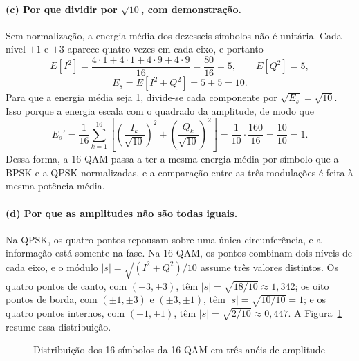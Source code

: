 \paragraph{(c) Por que dividir por $\sqrt{10}$, com demonstração.} Sem normalização, a energia média dos dezesseis símbolos não é unitária. Cada nível $\pm1$ e $\pm3$ aparece quatro vezes em cada eixo, e portanto
\begin{equation}
E[I^2]=\frac{4\cdot1+4\cdot1+4\cdot9+4\cdot9}{16}=\frac{80}{16}=5,
\qquad
E[Q^2]=5,
\end{equation}
\begin{equation}
E_s=E[I^2+Q^2]=5+5=10.
\end{equation}
Para que a energia média seja 1, divide-se cada componente por $\sqrt{E_s}=\sqrt{10}$. Isso porque a energia escala com o quadrado da amplitude, de modo que
\begin{equation}
E_s'=\frac{1}{16}\sum_{k=1}^{16}\left[\left(\frac{I_k}{\sqrt{10}}\right)^2+\left(\frac{Q_k}{\sqrt{10}}\right)^2\right]=\frac{1}{10}\cdot\frac{160}{16}=\frac{10}{10}=1.
\end{equation}
Dessa forma, a 16-QAM passa a ter a mesma energia média por símbolo que a BPSK e a QPSK normalizadas, e a comparação entre as três modulações é feita à mesma potência média.

\paragraph{(d) Por que as amplitudes não são todas iguais.} Na QPSK, os quatro pontos repousam sobre uma única circunferência, e a informação está somente na fase. Na 16-QAM, os pontos combinam dois níveis de cada eixo, e o módulo $|s|=\sqrt{(I^2+Q^2)/10}$ assume três valores distintos. Os quatro pontos de canto, com $(\pm3,\pm3)$, têm $|s|=\sqrt{18/10}\approx1{,}342$; os oito pontos de borda, com $(\pm1,\pm3)$ e $(\pm3,\pm1)$, têm $|s|=\sqrt{10/10}=1$; e os quatro pontos internos, com $(\pm1,\pm1)$, têm $|s|=\sqrt{2/10}\approx0{,}447$. A Figura~\ref{fig:aneis} resume essa distribuição.

\begin{figure}[H]
\centering
{}
\caption{Distribuição dos 16 símbolos da 16-QAM em três anéis de amplitude}\label{fig:aneis}
\end{figure}

